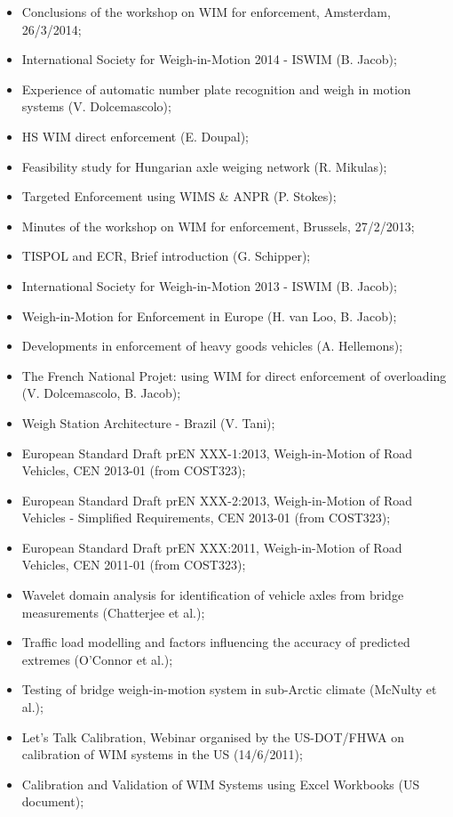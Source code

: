 \documentclass{ufscThesis}
\begin{document}
\begin{itemize}
\item Conclusions of the workshop on WIM for enforcement, Amsterdam, 26/3/2014;
\item International Society for Weigh-in-Motion 2014 - ISWIM (B. Jacob);
\item Experience of automatic number plate recognition and weigh in motion systems (V. Dolcemascolo);
\item HS WIM direct enforcement (E. Doupal);
\item Feasibility study for Hungarian axle weiging network (R. Mikulas);
\item Targeted Enforcement using WIMS \& ANPR (P. Stokes);
\item Minutes of the workshop on WIM for enforcement, Brussels, 27/2/2013;
\item TISPOL and ECR, Brief introduction (G. Schipper);
\item International Society for Weigh-in-Motion 2013 - ISWIM (B. Jacob);
\item Weigh-in-Motion for Enforcement in Europe (H. van Loo, B. Jacob);
\item Developments in enforcement of heavy goods vehicles (A. Hellemons);
\item The French National Projet: using WIM for direct enforcement of overloading (V. Dolcemascolo, B. Jacob);
\item Weigh Station Architecture - Brazil (V. Tani);
\item European Standard Draft prEN XXX-1:2013, Weigh-in-Motion of Road Vehicles, CEN 2013-01 (from COST323);
\item European Standard Draft prEN XXX-2:2013, Weigh-in-Motion of Road Vehicles - Simplified Requirements, CEN 2013-01 (from COST323);
\item European Standard Draft prEN XXX:2011, Weigh-in-Motion of Road Vehicles, CEN 2011-01 (from COST323);
\item Wavelet domain analysis for identification of vehicle axles from bridge measurements (Chatterjee et al.);
\item Traffic load modelling and factors influencing the accuracy of predicted extremes (O'Connor et al.);
\item Testing of bridge weigh-in-motion system in sub-Arctic climate (McNulty et al.);
\item Let's Talk Calibration, Webinar organised by the US-DOT/FHWA on calibration of WIM systems in the US (14/6/2011);
\item Calibration and Validation of WIM Systems using Excel Workbooks (US document);

\end{itemize}
\end{document}
